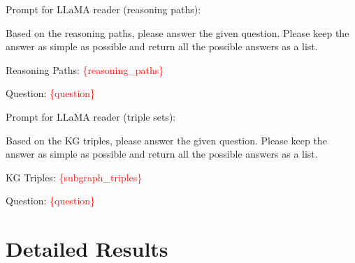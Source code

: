 \documentclass[11pt]{article}
\begin{document}
\noindent Prompt for LLaMA reader (reasoning paths):

\begin{tcolorbox}
    Based on the reasoning paths, please answer the given question. Please keep the answer as simple as possible and return all the possible answers as a list.
    
    Reasoning Paths: \textcolor{red}{\{reasoning\_paths\}}
    
    Question: \textcolor{red}{\{question\}}
\end{tcolorbox}

\noindent Prompt for LLaMA reader (triple sets):

\begin{tcolorbox}
    Based on the KG triples, please answer the given question. Please keep the answer as simple as possible and return all the possible answers as a list.
    
    KG Triples: \textcolor{red}{\{subgraph\_triples\}}
    
    Question: \textcolor{red}{\{question\}}
\end{tcolorbox}


\section{Detailed Results}
\end{document}
